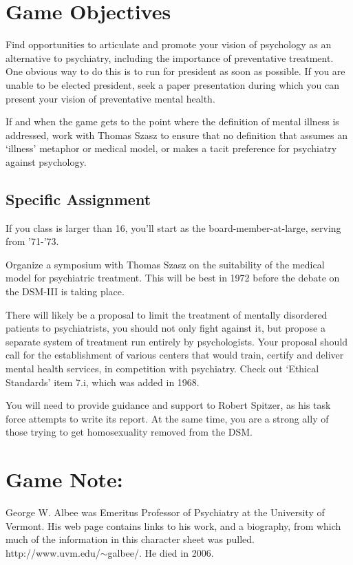 \begin{refsection}
\section{Game Objectives}
\label{gameobjectives}

Find opportunities to articulate and promote your vision of psychology as an alternative to psychiatry, including the importance of preventative treatment. One obvious way to do this is to run for president as soon as possible. If you are unable to be elected president, seek a paper presentation during which you can present your vision of preventative mental health.

If and when the game gets to the point where the definition of mental illness is addressed, work with Thomas Szasz to ensure that no definition that assumes an `illness' metaphor or medical model, or makes a tacit preference for psychiatry against psychology.

\subsection{Specific Assignment}
\label{specificassignment}

If you class is larger than 16, you'll start as the board-member-at-large, serving from '71-'73.

Organize a symposium with Thomas Szasz on the suitability of the medical model for psychiatric treatment. This will be best in 1972 before the debate on the DSM-III is taking place.

There will likely be a proposal to limit the treatment of mentally disordered patients to psychiatrists, you should not only fight against it, but propose a separate system of treatment run entirely by psychologists. Your proposal should call for the establishment of various centers that would train, certify and deliver mental health services, in competition with psychiatry. Check out `Ethical Standards' item 7.i, which was added in 1968.

You will need to provide guidance and support to Robert Spitzer, as his task force attempts to write its report. At the same time, you are a strong ally of those trying to get homosexuality removed from the DSM.

\section{Game Note:}
\label{gamenote:}

George W. Albee was Emeritus Professor of Psychiatry at the University of Vermont. His web page contains links to his work, and a biography, from which much of the information in this character sheet was pulled. http:\slash \slash www.uvm.edu\slash \ensuremath{\sim}galbee\slash . He died in 2006.


\end{refsection}

